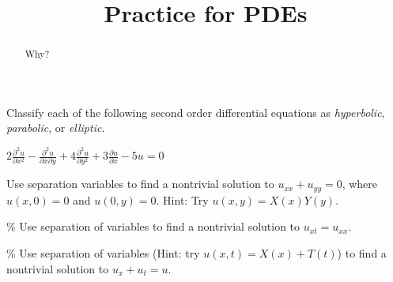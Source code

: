 \documentclass{ximera}
\title{Practice for PDEs}
\begin{document}
\begin{abstract}
Why?
\end{abstract}
\maketitle

\begin{exercise}
    Classify each of the following second order differential equations as \emph{hyperbolic}, \emph{parabolic}, or \emph{elliptic}.
    \begin{tasks}
        \task $\displaystyle 2 \frac{\partial^2 u}{\partial x^2} - \frac{\partial^2 u}{\partial x \partial y} + 4 \frac{\partial^2 u}{\partial y^2} + 3 \frac{\partial u}{\partial x} - 5u = 0$
    \end{tasks}
\end{exercise}

\begin{exercise}
    Use separation variables to find a nontrivial solution to $u_{xx} + u_{yy} = 0$, where $u(x,0) = 0$ and $u(0,y) = 0$. Hint: Try $u(x,y) = X(x)Y(y)$.
\end{exercise}

\begin{exercise}\%
    Use separation of variables to find a nontrivial solution to $u_{xt} = u_{xx}$.
\end{exercise}

\begin{exercise}\%
    Use separation of variables (Hint: try $u(x,t) = X(x)+T(t)$) to find a nontrivial solution to $u_{x} + u_{t} = u$.
\end{exercise}
%
\end{document}
